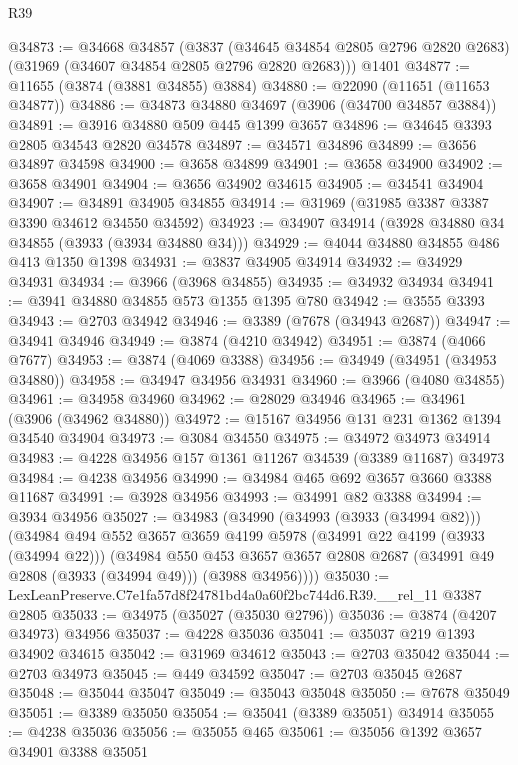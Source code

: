 \begin{lexlean}{R39}
\begin{coremodule}
@34873 := @34668
    @34857
    (@3837 (@34645 @34854 @2805 @2796 @2820 @2683) (@31969 (@34607 @34854 @2805 @2796 @2820 @2683)))
    @1401
@34877 := @11655 (@3874 (@3881 @34855) @3884)
@34880 := @22090 (@11651 (@11653 @34877))
@34886 := @34873 @34880 @34697 (@3906 (@34700 @34857 @3884))
@34891 := @3916 @34880 @509 @445 @1399 @3657
@34896 := @34645 @3393 @2805 @34543 @2820 @34578
@34897 := @34571 @34896
@34899 := @3656 @34897 @34598
@34900 := @3658 @34899
@34901 := @3658 @34900
@34902 := @3658 @34901
@34904 := @3656 @34902 @34615
@34905 := @34541 @34904
@34907 := @34891 @34905 @34855
@34914 := @31969 (@31985 @3387 @3387 @3390 @34612 @34550 @34592)
@34923 := @34907 @34914 (@3928 @34880 @34 @34855 (@3933 (@3934 @34880 @34)))
@34929 := @4044 @34880 @34855 @486 @413 @1350 @1398
@34931 := @3837 @34905 @34914
@34932 := @34929 @34931
@34934 := @3966 (@3968 @34855)
@34935 := @34932 @34934
@34941 := @3941 @34880 @34855 @573 @1355 @1395 @780
@34942 := @3555 @3393
@34943 := @2703 @34942
@34946 := @3389 (@7678 (@34943 @2687))
@34947 := @34941 @34946
@34949 := @3874 (@4210 @34942)
@34951 := @3874 (@4066 @7677)
@34953 := @3874 (@4069 @3388)
@34956 := @34949 (@34951 (@34953 @34880))
@34958 := @34947 @34956 @34931
@34960 := @3966 (@4080 @34855)
@34961 := @34958 @34960
@34962 := @28029 @34946
@34965 := @34961 (@3906 (@34962 @34880))
@34972 := @15167 @34956 @131 @231 @1362 @1394 @34540 @34904
@34973 := @3084 @34550
@34975 := @34972 @34973 @34914
@34983 := @4228 @34956 @157 @1361 @11267 @34539 (@3389 @11687) @34973
@34984 := @4238 @34956
@34990 := @34984 @465 @692 @3657 @3660 @3388 @11687
@34991 := @3928 @34956
@34993 := @34991 @82 @3388
@34994 := @3934 @34956
@35027 := @34983
    (@34990
      (@34993 (@3933 (@34994 @82)))
      (@34984
        @494
        @552
        @3657
        @3659
        @4199
        @5978
        (@34991 @22 @4199 (@3933 (@34994 @22)))
        (@34984
          @550
          @453
          @3657
          @3657
          @2808
          @2687
          (@34991 @49 @2808 (@3933 (@34994 @49)))
          (@3988 @34956))))
@35030 := LexLeanPreserve.C7e1fa57d8f24781bd4a0a60f2bc744d6.R39.__rel_11 @3387 @2805
@35033 := @34975 (@35027 (@35030 @2796))
@35036 := @3874 (@4207 @34973) @34956
@35037 := @4228 @35036
@35041 := @35037 @219 @1393 @34902 @34615
@35042 := @31969 @34612
@35043 := @2703 @35042
@35044 := @2703 @34973
@35045 := @449 @34592
@35047 := @2703 @35045 @2687
@35048 := @35044 @35047
@35049 := @35043 @35048
@35050 := @7678 @35049
@35051 := @3389 @35050
@35054 := @35041 (@3389 @35051) @34914
@35055 := @4238 @35036
@35056 := @35055 @465
@35061 := @35056 @1392 @3657 @34901 @3388 @35051

\end{coremodule}
\end{lexlean}
